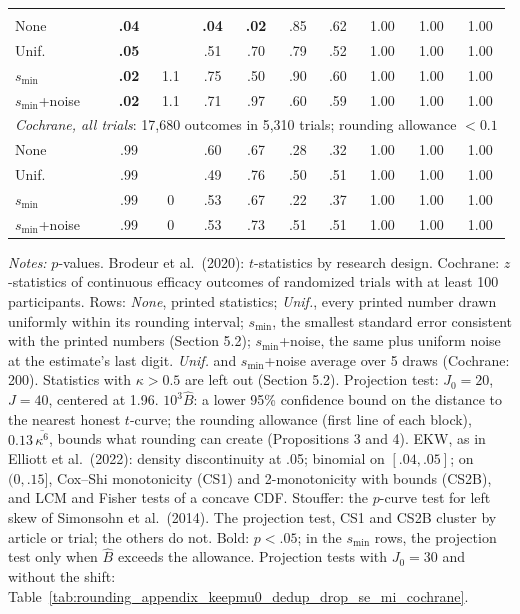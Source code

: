 \begin{table}[htbp]
{\begin{tabular}{lccccccccc}
\addlinespace
\multicolumn{10}{l}{\textit{RDD}: 2,696 $t$-statistics in 80 articles; rounding allowance $<0.1$} \\
None & \textbf{.04} &  & \textbf{.04} & \textbf{.02} & .85 & .62 & 1.00 & 1.00 & 1.00 \\
Unif. & \textbf{.05} &  & .51 & .70 & .79 & .52 & 1.00 & 1.00 & 1.00 \\
$s_{\min}$ & \textbf{.02} & 1.1 & .75 & .50 & .90 & .60 & 1.00 & 1.00 & 1.00 \\
$s_{\min}$+noise & \textbf{.02} & 1.1 & .71 & .97 & .60 & .59 & 1.00 & 1.00 & 1.00 \\
\midrule
\multicolumn{10}{l}{\textit{Cochrane, all trials}: 17,680 outcomes in 5,310 trials; rounding allowance $<0.1$} \\
None & .99 &  & .60 & .67 & .28 & .32 & 1.00 & 1.00 & 1.00 \\
Unif. & .99 &  & .49 & .76 & .50 & .51 & 1.00 & 1.00 & 1.00 \\
$s_{\min}$ & .99 & 0 & .53 & .67 & .22 & .37 & 1.00 & 1.00 & 1.00 \\
$s_{\min}$+noise & .99 & 0 & .53 & .73 & .51 & .51 & 1.00 & 1.00 & 1.00 \\
\bottomrule
\end{tabular}}

\medskip
\begin{minipage}{\linewidth}
\footnotesize
\textit{Notes:} $p$-values. Brodeur et al.\ (2020): $t$-statistics by research design. Cochrane: $z$-statistics of continuous efficacy outcomes of randomized trials with at least 100 participants.
Rows: \textit{None}, printed statistics; \textit{Unif.}, every printed number drawn uniformly within its rounding interval; $s_{\min}$, the smallest standard error consistent with the printed numbers (Section 5.2); $s_{\min}$+noise, the same plus uniform noise at the estimate's last digit. \textit{Unif.} and $s_{\min}$+noise average over 5 draws (Cochrane: 200).
Statistics with $\kappa>0.5$ are left out (Section 5.2).
Projection test: $J_0=20$, $J=40$, centered at 1.96. $10^3\widehat{B}$: a lower 95\% confidence bound on the distance to the nearest honest $t$-curve; the rounding allowance (first line of each block), $0.13\,\overline{\kappa^6}$, bounds what rounding can create (Propositions 3 and 4).
EKW, as in Elliott et al.\ (2022): density discontinuity at .05; binomial on $[.04,.05]$; on $(0,.15]$, Cox--Shi monotonicity (CS1) and 2-monotonicity with bounds (CS2B), and LCM and Fisher tests of a concave CDF.
Stouffer: the $p$-curve test for left skew of Simonsohn et al.\ (2014).
The projection test, CS1 and CS2B cluster by article or trial; the others do not.
Bold: $p<.05$; in the $s_{\min}$ rows, the projection test only when $\widehat{B}$ exceeds the allowance.
Projection tests with $J_0=30$ and without the shift: Table~\ref{tab:rounding_appendix_keepmu0_dedup_drop_se_mi_cochrane}.
\end{minipage}
\end{table}
